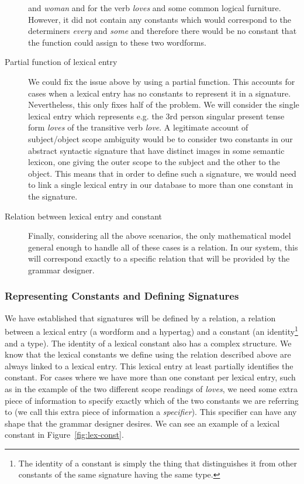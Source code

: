 \begin{description}
    and \emph{woman} and for the verb \emph{loves} and some common
    logical furniture. However, it did not contain any constants which
    would correspond to the determiners \emph{every} and \emph{some} and
    therefore there would be no constant that the function could assign
    to these two wordforms.
  \item[Partial function of lexical entry] We could fix the issue above
    by using a partial function. This accounts for cases when a lexical
    entry has no constants to represent it in a signature. Nevertheless,
    this only fixes half of the problem. We will consider the single
    lexical entry which represents e.g. the 3rd person singular present
    tense form \emph{loves} of the transitive verb \emph{love}. A
    legitimate account of subject/object scope ambiguity would be to
    consider two constants in our abstract syntactic signature that have
    distinct images in some semantic lexicon, one giving the outer scope
    to the subject and the other to the object. This means that in order
    to define such a signature, we would need to link a single lexical
    entry in our database to more than one constant in the signature.
  \item[Relation between lexical entry and constant] Finally,
    considering all the above scenarios, the only mathematical model
    general enough to handle all of these cases is a relation. In our
    system, this will correspond exactly to a specific relation that
    will be provided by the grammar designer.
\end{description}

\subsubsection{Representing Constants and Defining Signatures}

We have established that signatures will be defined by a relation, a
relation between a lexical entry (a wordform and a hypertag) and a
constant (an identity\footnote{The identity of a constant is simply the
  thing that distinguishes it from other constants of the same signature
  having the same type.} and a type). The identity of a lexical constant
also has a complex structure. We know that the lexical constants we
define using the relation described above are always linked to a lexical
entry. This lexical entry at least partially identifies the
constant. For cases where we have more than one constant per lexical
entry, such as in the example of the two different scope readings of
\emph{loves}, we need some extra piece of information to specify exactly
which of the two constants we are referring to (we call this extra piece
of information a \emph{specifier}). This specifier can have any shape
that the grammar designer desires. We can see an example of a lexical
constant in Figure~\ref{fig:lex-const}.


